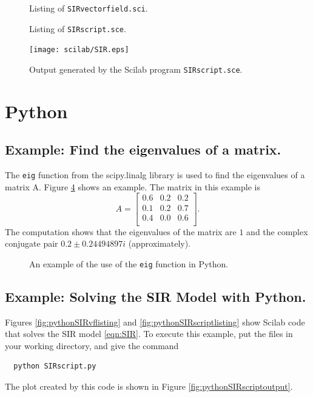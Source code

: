 \documentclass[reqno]{immbook}
\numberwithin{equation}{chapter}
\numberwithin{question}{section}
\numberwithin{theorem}{chapter}
\numberwithin{figure}{chapter}
\theoremstyle{definition}
\begin{document}
%
%
\begin{figure}
\fbox{%

}
\caption{Listing of \texttt{SIRvectorfield.sci}.}
\label{fig:scilabSIRvflisting}
\end{figure}

\begin{figure}
\fbox{%

}
\caption{Listing of \texttt{SIRscript.sce}.}
\label{fig:scilabSIRscriptlisting}
\end{figure}

\begin{figure}
\centerline{\texttt{[image: scilab/SIR.eps]}}
\caption{Output generated by the Scilab program
\texttt{SIRscript.sce}.}
\label{fig:scilabSIRscriptoutput}
\end{figure}
%
%
\section{Python}
\subsection*{Example: Find the eigenvalues of a matrix.}
The \texttt{eig} function from the scipy.linalg library 
is used to find the eigenvalues
of a matrix A.
Figure \ref{fig:pythoneigenvaluesoutput} shows an example.
The matrix in this example is
\[
   A = \begin{bmatrix}
          0.6 & 0.2 & 0.2 \\
	  0.1 & 0.2 & 0.7 \\
	  0.4 & 0.0 & 0.6 \\
       \end{bmatrix} .
\]
The computation shows that the eigenvalues of the 
matrix are $1$ and the complex conjugate pair
$0.2 \pm  0.24494897i$
(approximately).

\begin{figure}[hbp]
\fbox{%

}
\caption{An example of the use of
the \texttt{eig} function in Python.}
\label{fig:pythoneigenvaluesoutput}
\end{figure}

\subsection*{Example: Solving the SIR Model with Python.}
Figures \ref{fig:pythonSIRvflisting} and
\ref{fig:pythonSIRscriptlisting} show Scilab code that solves
the SIR model \eqref{eqn:SIR}.
To execute this example, put the files in your working
directory, and give the command
\begin{verbatim}
  python SIRscript.py
\end{verbatim}
The plot created by this code is shown
in Figure \ref{fig:pythonSIRscriptoutput}.
\end{document}

